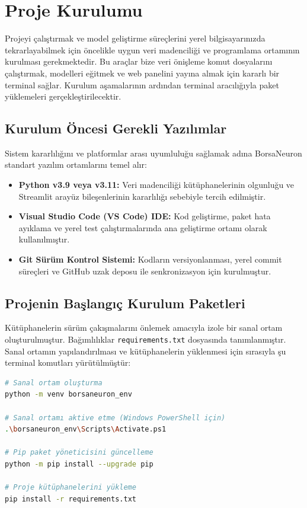 \documentclass[12pt,a4paper]{report}
\begin{document}
\chapter{Proje Kurulumu}

Projeyi çalıştırmak ve model geliştirme süreçlerini yerel bilgisayarınızda tekrarlayabilmek için öncelikle uygun veri madenciliği ve programlama ortamının kurulması gerekmektedir. Bu araçlar bize veri önişleme komut dosyalarını çalıştırmak, modelleri eğitmek ve web panelini yayına almak için kararlı bir terminal sağlar. Kurulum aşamalarının ardından terminal aracılığıyla paket yüklemeleri gerçekleştirilecektir.

\section{Kurulum Öncesi Gerekli Yazılımlar}
Sistem kararlılığını ve platformlar arası uyumluluğu sağlamak adına BorsaNeuron standart yazılım ortamlarını temel alır:
\begin{itemize}
    \item \textbf{Python v3.9 veya v3.11:} Veri madenciliği kütüphanelerinin olgunluğu ve Streamlit arayüz bileşenlerinin kararlılığı sebebiyle tercih edilmiştir.
    \item \textbf{Visual Studio Code (VS Code) IDE:} Kod geliştirme, paket hata ayıklama ve yerel test çalıştırmalarında ana geliştirme ortamı olarak kullanılmıştır.
    \item \textbf{Git Sürüm Kontrol Sistemi:} Kodların versiyonlanması, yerel commit süreçleri ve GitHub uzak deposu ile senkronizasyon için kurulmuştur.
\end{itemize}

\newpage
\section{Projenin Başlangıç Kurulum Paketleri}
Kütüphanelerin sürüm çakışmalarını önlemek amacıyla izole bir sanal ortam oluşturulmuştur. Bağımlılıklar \texttt{requirements.txt} dosyasında tanımlanmıştır. Sanal ortamın yapılandırılması ve kütüphanelerin yüklenmesi için sırasıyla şu terminal komutları yürütülmüştür:

\begin{lstlisting}[language=bash, caption=Sanal Ortam Kurulum Adımları]
# Sanal ortam oluşturma
python -m venv borsaneuron_env

# Sanal ortamı aktive etme (Windows PowerShell için)
.\borsaneuron_env\Scripts\Activate.ps1

# Pip paket yöneticisini güncelleme
python -m pip install --upgrade pip

# Proje kütüphanelerini yükleme
pip install -r requirements.txt
\end{lstlisting}
\end{document}
